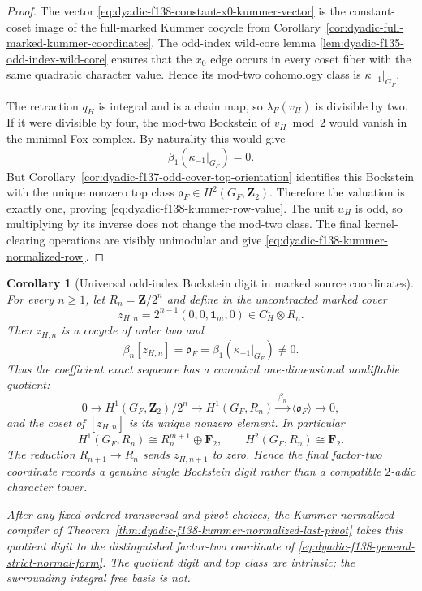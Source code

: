 \documentclass[11pt]{article}
\newtheorem{corollary}[theorem]{Corollary}
\theoremstyle{definition}
\begin{document}
\begin{proof}
The vector
\eqref{eq:dyadic-f138-constant-x0-kummer-vector}
is the constant-coset image of the full-marked
Kummer cocycle from
Corollary~\ref{cor:dyadic-full-marked-kummer-coordinates}.
The odd-index wild-core lemma
\ref{lem:dyadic-f135-odd-index-wild-core}
ensures that the $x_0$ edge occurs in every coset
fiber with the same quadratic character value.
Hence its mod-two cohomology class is
$\kappa_{-1}|_{G_F}$.

The retraction $q_H$ is integral and is a chain
map, so $\lambda_F(v_H)$ is divisible by two.
If it were divisible by four, the mod-two
Bockstein of $v_H\bmod2$ would vanish in the
minimal Fox complex.  By naturality this would
give
\[
\beta_1(\kappa_{-1}|_{G_F})=0.
\]
But
Corollary~\ref{cor:dyadic-f137-odd-cover-top-orientation}
identifies this Bockstein with the unique nonzero
top class
$\mathfrak o_F\in H^2(G_F,\mathbf Z_2)$.
Therefore the valuation is exactly one, proving
\eqref{eq:dyadic-f138-kummer-row-value}.
The unit $u_H$ is odd, so multiplying by its
inverse does not change the mod-two class.
The final kernel-clearing operations are visibly
unimodular and give
\eqref{eq:dyadic-f138-kummer-normalized-row}.
\end{proof}

\begin{corollary}[Universal odd-index Bockstein digit in marked source coordinates]
\label{cor:dyadic-f138-universal-bockstein-digit}
For every $n\ge1$, let
$R_n=\mathbf Z/2^n$ and define in the
\emph{uncontracted marked cover}
\begin{equation}\label{eq:dyadic-f138-universal-zn}
\boxed{\qquad
z_{H,n}
=2^{n-1}(0,0,\mathbf1_m,0)
\in C_H^1\otimes R_n .
\qquad}
\end{equation}
Then $z_{H,n}$ is a cocycle of order two and
\begin{equation}\label{eq:dyadic-f138-universal-beta}
\boxed{\qquad
\beta_n[z_{H,n}]
=\mathfrak o_F
=\beta_1(\kappa_{-1}|_{G_F})
\ne0 .
\qquad}
\end{equation}
Thus the coefficient exact sequence has a
canonical one-dimensional nonliftable quotient:
\begin{equation}\label{eq:dyadic-f138-universal-uct}
\boxed{
0\longrightarrow
H^1(G_F,\mathbf Z_2)/2^n
\longrightarrow
H^1(G_F,R_n)
\xrightarrow{\ \beta_n\ }
\langle\mathfrak o_F\rangle
\longrightarrow0,
}
\end{equation}
and the coset of $[z_{H,n}]$ is its unique
nonzero element.  In particular
\[
H^1(G_F,R_n)\cong R_n^{m+1}\oplus\mathbf F_2,
\qquad
H^2(G_F,R_n)\cong\mathbf F_2.
\]
The reduction $R_{n+1}\to R_n$ sends
$z_{H,n+1}$ to zero.  Hence the final
factor-two coordinate records a genuine
single Bockstein digit rather than a compatible
$2$-adic character tower.

After any fixed ordered-transversal and pivot
choices, the Kummer-normalized compiler of
Theorem~\ref{thm:dyadic-f138-kummer-normalized-last-pivot}
takes this quotient digit to the distinguished
factor-two coordinate of
\eqref{eq:dyadic-f138-general-strict-normal-form}.
The quotient digit and top class are intrinsic;
the surrounding integral free basis is not.
\end{corollary}
\end{document}
